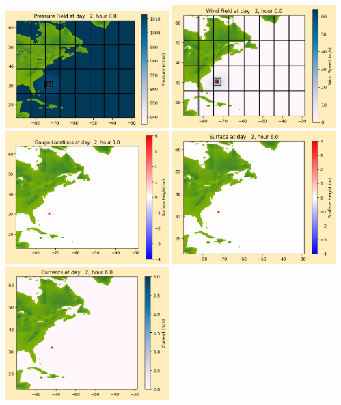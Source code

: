 \documentclass[11pt]{article}
\begin{document}
\includegraphics[width=0.475\textwidth]{frame0020fig1012.png}
\vskip 10pt 
\includegraphics[width=0.475\textwidth]{frame0020fig1013.png}
\includegraphics[width=0.475\textwidth]{frame0020fig1014.png}
\vskip 10pt 
\includegraphics[width=0.475\textwidth]{frame0021fig1001.png}
\includegraphics[width=0.475\textwidth]{frame0021fig1002.png}
\end{document}
